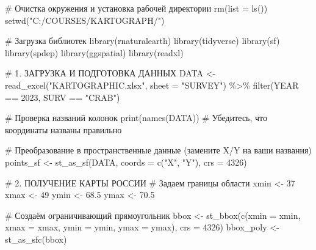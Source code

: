\documentclass[
  letterpaper,
  DIV=11,
  numbers=noendperiod]{scrreprt}
\newenvironment{Shaded}{\begin{snugshade}}{\end{snugshade}}
\newcommand{\AttributeTok}[1]{\textcolor[rgb]{0.40,0.45,0.13}{#1}}
\newcommand{\CommentTok}[1]{\textcolor[rgb]{0.37,0.37,0.37}{#1}}
\newcommand{\DecValTok}[1]{\textcolor[rgb]{0.68,0.00,0.00}{#1}}
\newcommand{\FloatTok}[1]{\textcolor[rgb]{0.68,0.00,0.00}{#1}}
\newcommand{\FunctionTok}[1]{\textcolor[rgb]{0.28,0.35,0.67}{#1}}
\newcommand{\NormalTok}[1]{\textcolor[rgb]{0.00,0.23,0.31}{#1}}
\newcommand{\OtherTok}[1]{\textcolor[rgb]{0.00,0.23,0.31}{#1}}
\newcommand{\SpecialCharTok}[1]{\textcolor[rgb]{0.37,0.37,0.37}{#1}}
\newcommand{\StringTok}[1]{\textcolor[rgb]{0.13,0.47,0.30}{#1}}
\begin{document}
\begin{Shaded}
\begin{Highlighting}[]
\CommentTok{\# Очистка окружения и установка рабочей директории}
\FunctionTok{rm}\NormalTok{(}\AttributeTok{list =} \FunctionTok{ls}\NormalTok{())}
\FunctionTok{setwd}\NormalTok{(}\StringTok{"C:/COURSES/KARTOGRAPH/"}\NormalTok{)}

\CommentTok{\# Загрузка библиотек}
\FunctionTok{library}\NormalTok{(rnaturalearth)}
\FunctionTok{library}\NormalTok{(tidyverse)}
\FunctionTok{library}\NormalTok{(sf)}
\FunctionTok{library}\NormalTok{(spdep)}
\FunctionTok{library}\NormalTok{(ggspatial)}
\FunctionTok{library}\NormalTok{(readxl)}

\CommentTok{\# 1. ЗАГРУЗКА И ПОДГОТОВКА ДАННЫХ}
\NormalTok{DATA }\OtherTok{\textless{}{-}} \FunctionTok{read\_excel}\NormalTok{(}\StringTok{"KARTOGRAPHIC.xlsx"}\NormalTok{, }\AttributeTok{sheet =} \StringTok{"SURVEY"}\NormalTok{) }\SpecialCharTok{\%\textgreater{}\%} 
  \FunctionTok{filter}\NormalTok{(YEAR }\SpecialCharTok{==} \DecValTok{2023}\NormalTok{, SURV }\SpecialCharTok{==} \StringTok{"CRAB"}\NormalTok{)}

\CommentTok{\# Проверка названий колонок}
\FunctionTok{print}\NormalTok{(}\FunctionTok{names}\NormalTok{(DATA))  }\CommentTok{\# Убедитесь, что координаты названы правильно}

\CommentTok{\# Преобразование в пространственные данные (замените X/Y на ваши названия)}
\NormalTok{points\_sf }\OtherTok{\textless{}{-}} \FunctionTok{st\_as\_sf}\NormalTok{(DATA, }\AttributeTok{coords =} \FunctionTok{c}\NormalTok{(}\StringTok{"X"}\NormalTok{, }\StringTok{"Y"}\NormalTok{), }\AttributeTok{crs =} \DecValTok{4326}\NormalTok{)}

\CommentTok{\# 2. ПОЛУЧЕНИЕ КАРТЫ РОССИИ}
\CommentTok{\# Задаем границы области}
\NormalTok{xmin }\OtherTok{\textless{}{-}} \DecValTok{37}
\NormalTok{xmax }\OtherTok{\textless{}{-}} \DecValTok{49}
\NormalTok{ymin }\OtherTok{\textless{}{-}} \FloatTok{68.5}
\NormalTok{ymax }\OtherTok{\textless{}{-}} \FloatTok{70.5}

\CommentTok{\# Создаём ограничивающий прямоугольник}
\NormalTok{bbox }\OtherTok{\textless{}{-}} \FunctionTok{st\_bbox}\NormalTok{(}\FunctionTok{c}\NormalTok{(}\AttributeTok{xmin =}\NormalTok{ xmin, }\AttributeTok{xmax =}\NormalTok{ xmax, }\AttributeTok{ymin =}\NormalTok{ ymin, }\AttributeTok{ymax =}\NormalTok{ ymax), }\AttributeTok{crs =} \DecValTok{4326}\NormalTok{)}
\NormalTok{bbox\_poly }\OtherTok{\textless{}{-}} \FunctionTok{st\_as\_sfc}\NormalTok{(bbox)}


\end{Highlighting}
\end{Shaded}
\end{document}
